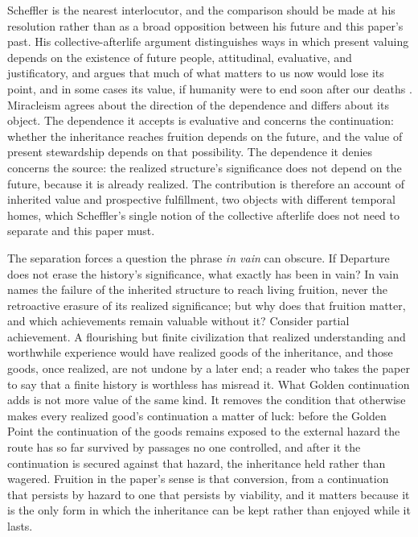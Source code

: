 Scheffler is the nearest interlocutor, and the comparison should be made at
his resolution rather than as a broad opposition between his future and this
paper's past. His collective-afterlife argument distinguishes ways in which
present valuing depends on the existence of future people, attitudinal,
evaluative, and justificatory, and argues that much of what matters to us now
would lose its point, and in some cases its value, if humanity were to end
soon after our deaths \cite{Scheffler13}. Miracleism agrees about the
direction of the dependence and differs about its object. The dependence it
accepts is evaluative and concerns the continuation: whether the inheritance
reaches fruition depends on the future, and the value of present stewardship
depends on that possibility. The dependence it denies concerns the source: the
realized structure's significance does not depend on the future, because it is
already realized. The contribution is therefore an account of inherited value
and prospective fulfillment, two objects with different temporal homes, which
Scheffler's single notion of the collective afterlife does not need to
separate and this paper must.

The separation forces a question the phrase \emph{in vain} can obscure. If
Departure does not erase the history's significance, what exactly has been in
vain? In vain names the failure of the inherited structure to
reach living fruition, never the retroactive erasure of its realized
significance; but why does that fruition matter, and which achievements
remain valuable without it? Consider partial achievement. A flourishing but
finite civilization that realized understanding and worthwhile experience
would have realized goods of the inheritance, and those goods, once realized,
are not undone by a later end; a reader who takes the paper to say that a
finite history is worthless has misread it. What Golden continuation adds is
not more value of the same kind. It removes the condition that otherwise
makes every realized good's continuation a matter of luck: before the Golden
Point the continuation of the goods remains exposed to the external hazard the
route has so far survived by passages no one controlled, and after it the
continuation is secured against that hazard, the inheritance held rather than
wagered. Fruition in the paper's sense is that conversion, from a continuation
that persists by hazard to one that persists by viability, and it matters
because it is the only form in which the inheritance can be kept rather than
enjoyed while it lasts.

